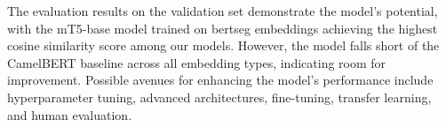 \documentclass[15pt]{article}
\begin{document}
The evaluation results on the validation set demonstrate the model's potential, with the mT5-base model trained on bertseg embeddings achieving the highest cosine similarity score among our models. However, the model falls short of the CamelBERT baseline across all embedding types, indicating room for improvement. Possible avenues for enhancing the model's performance include hyperparameter tuning, advanced architectures, fine-tuning, transfer learning, and human evaluation.

\newpage

\printbibheading[title={References},heading=bibintoc] 
\printbibliography[heading=none]\label{lastpage}

\end{document}
